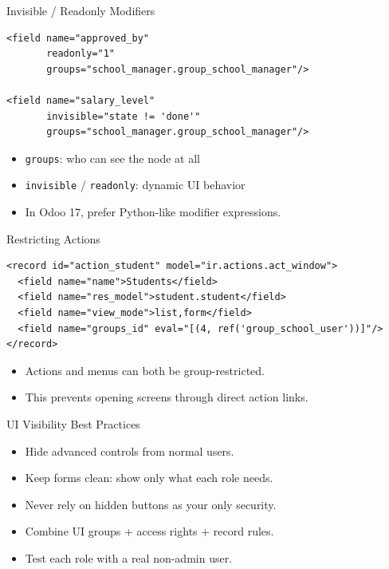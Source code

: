 \begin{frame}[fragile]{Invisible / Readonly Modifiers}
\begin{lstlisting}[style=xml]
<field name="approved_by"
	   readonly="1"
	   groups="school_manager.group_school_manager"/>

<field name="salary_level"
	   invisible="state != 'done'"
	   groups="school_manager.group_school_manager"/>
\end{lstlisting}
	\begin{itemize}
		\item \texttt{groups}: who can see the node at all
		\item \texttt{invisible} / \texttt{readonly}: dynamic UI behavior
		\item In Odoo 17, prefer Python-like modifier expressions.
	\end{itemize}
\end{frame}

\begin{frame}[fragile]{Restricting Actions}
\begin{lstlisting}[style=xml]
<record id="action_student" model="ir.actions.act_window">
  <field name="name">Students</field>
  <field name="res_model">student.student</field>
  <field name="view_mode">list,form</field>
  <field name="groups_id" eval="[(4, ref('group_school_user'))]"/>
</record>
\end{lstlisting}
	\begin{itemize}
		\item Actions and menus can both be group-restricted.
		\item This prevents opening screens through direct action links.
	\end{itemize}
\end{frame}

\begin{frame}{UI Visibility Best Practices}
	\begin{itemize}
		\item Hide advanced controls from normal users.
		\item Keep forms clean: show only what each role needs.
		\item Never rely on hidden buttons as your only security.
		\item Combine UI groups + access rights + record rules.
		\item Test each role with a real non-admin user.
	\end{itemize}
\end{frame}

